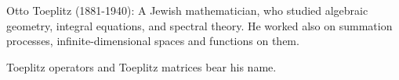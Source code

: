 Otto Toeplitz (1881-1940): A Jewish mathematician, who studied algebraic 
geometry, integral equations, and spectral theory. He worked also on summation
processes, infinite-dimensional spaces and functions on them. 
\par
Toeplitz operators and Toeplitz matrices bear his name.